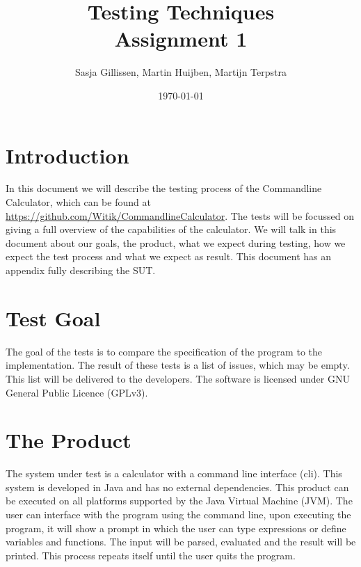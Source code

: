 \documentclass[11pt,a4paper]{article}
\author{Sasja Gillissen, Martin Huijben, Martijn Terpstra}
\date{\today}
\title{Testing Techniques\\
  \textbf{Assignment 1}}
\begin{document}
\maketitle

\section{Introduction}
In this document we will describe the testing process of the Commandline Calculator, which can be found at \url{https://github.com/Witik/CommandlineCalculator}. The tests will be focussed on giving a full overview of the capabilities of the calculator. We will talk in this document about our goals, the product, what we expect during testing, how we expect the test process and what we expect as result. This document has an appendix fully describing the SUT.

\section{Test Goal}
The goal of the tests is to compare the specification of the program to the implementation. The result of these tests is a list of issues, which may be empty. This list will be delivered to the developers. The software is licensed under GNU General Public Licence (GPLv3).



\section{The Product}
The system under test is a calculator with a command line interface (cli). This system is developed in Java and has no external dependencies. This product can be executed on all platforms supported by the Java Virtual Machine (JVM). The user can interface with the program using the command line, upon executing the program, it will show a prompt in which the user can type expressions or define variables and functions. The input will be parsed, evaluated and the result will be printed. This process repeats itself until the user quits the program.

\end{document}
